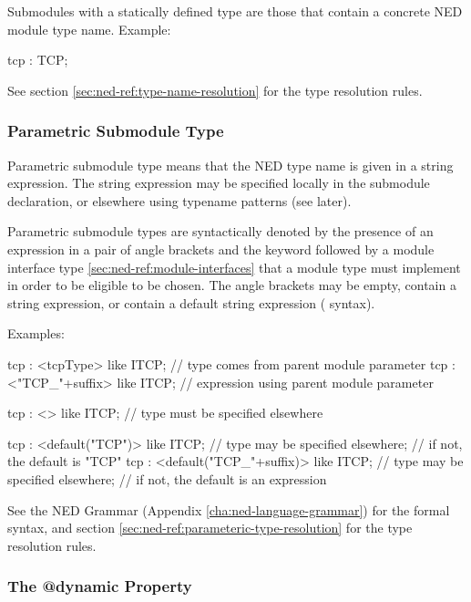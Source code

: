 Submodules with a statically defined type are those that contain a concrete
NED module type name. Example:

\begin{ned}
tcp : TCP;
\end{ned}

See section \ref{sec:ned-ref:type-name-resolution} for the type resolution
rules.


\subsubsection{Parametric Submodule Type}
\label{sec:ned-ref:parametric-submodule-type}

Parametric submodule type means that the NED type name is given in a string
expression. The string expression may be specified locally in the submodule
declaration, or elsewhere using typename patterns (see later).

Parametric submodule types are syntactically denoted by the presence of an
expression in a pair of angle brackets and the  keyword
followed by a module interface type \ref{sec:ned-ref:module-interfaces}
that a module type must implement in order to be eligible to be chosen.
The angle brackets may be empty, contain a string expression, or contain a
default string expression ( syntax).

Examples:

\begin{ned}
tcp : <tcpType> like ITCP;        // type comes from parent module parameter
tcp : <"TCP_"+suffix> like ITCP;  // expression using parent module parameter

tcp : <> like ITCP;               // type must be specified elsewhere

tcp : <default("TCP")> like ITCP; // type may be specified elsewhere;
                                  // if not, the default is "TCP"
tcp : <default("TCP_"+suffix)> like ITCP;
                                  // type may be specified elsewhere;
                                  // if not, the default is an expression
\end{ned}

See the NED Grammar (Appendix \ref{cha:ned-language-grammar}) for the
formal syntax, and section \ref{sec:ned-ref:parameteric-type-resolution}
for the type resolution rules.

\subsubsection{The @dynamic Property}
\label{sec:ned-ref:dynamic-property}


